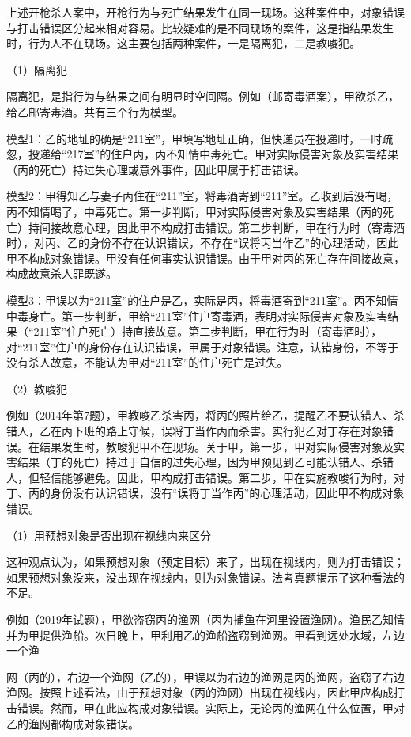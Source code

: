 上述开枪杀人案中，开枪行为与死亡结果发生在同一现场。这种案件中，对象错误与打击错误区分起来相对容易。比较疑难的是不同现场的案件，这是指结果发生时，行为人不在现场。这主要包括两种案件，一是隔离犯，二是教唆犯。

（1）隔离犯

隔离犯，是指行为与结果之间有明显时空间隔。例如（邮寄毒酒案），甲欲杀乙，给乙邮寄毒酒。共有三个行为模型。

模型1：乙的地址的确是“211室”，甲填写地址正确，但快递员在投递时，一时疏忽，投递给“217室”的住户丙，丙不知情中毒死亡。甲对实际侵害对象及实害结果（丙的死亡）持过失心理或意外事件，因此甲属于打击错误。

模型2：甲得知乙与妻子丙住在“211”室，将毒酒寄到“211”室。乙收到后没有喝，丙不知情喝了，中毒死亡。第一步判断，甲对实际侵害对象及实害结果（丙的死亡）持间接故意心理，因此甲不构成打击错误。第二步判断，甲在行为时（寄毒酒时），对丙、乙的身份不存在认识错误，不存在“误将丙当作乙”的心理活动，因此甲不构成对象错误。甲没有任何事实认识错误。由于甲对丙的死亡存在间接故意，构成故意杀人罪既遂。

模型3：甲误以为“211室”的住户是乙，实际是丙，将毒酒寄到“211室”。丙不知情中毒身亡。第一步判断，甲给“211室”住户寄毒酒，表明对实际侵害对象及实害结果（“211室”住户死亡）持直接故意。第二步判断，甲在行为时（寄毒酒时），对“211室”住户的身份存在认识错误，甲属于对象错误。注意，认错身份，不等于没有杀人故意，不能认为甲对“211室”的住户死亡是过失。

（2）教唆犯

例如（2014年第7题），甲教唆乙杀害丙，将丙的照片给乙，提醒乙不要认错人、杀错人，乙在丙下班的路上守候，误将丁当作丙而杀害。实行犯乙对丁存在对象错误。在结果发生时，教唆犯甲不在现场。关于甲，第一步，甲对实际侵害对象及实害结果（丁的死亡）持过于自信的过失心理，因为甲预见到乙可能认错人、杀错人，但轻信能够避免。因此，甲构成打击错误。第二步，甲在实施教唆行为时，对丁、丙的身份没有认识错误，没有“误将丁当作丙”的心理活动，因此甲不构成对象错误。


（1）用预想对象是否出现在视线内来区分

这种观点认为，如果预想对象（预定目标）来了，出现在视线内，则为打击错误；如果预想对象没来，没出现在视线内，则为对象错误。法考真题揭示了这种看法的不足。

例如（2019年试题），甲欲盗窃丙的渔网（丙为捕鱼在河里设置渔网）。渔民乙知情并为甲提供渔船。次日晚上，甲利用乙的渔船盗窃到渔网。甲看到远处水域，左边一个渔

网（丙的），右边一个渔网（乙的），甲误以为右边的渔网是丙的渔网，盗窃了右边渔网。按照上述看法，由于预想对象（丙的渔网）出现在视线内，因此甲应构成打击错误。然而，甲在此应构成对象错误。实际上，无论丙的渔网在什么位置，甲对乙的渔网都构成对象错误。

